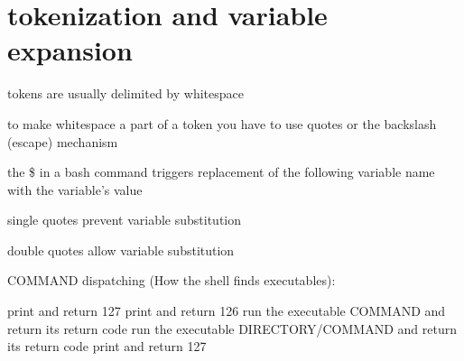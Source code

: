 \documentclass[landscape]{foils}
\begin{document}
\myNewSlide
\section*{ tokenization and variable expansion}
\begin{compactenum}
	\item tokens are usually delimited by whitespace
	\item to make whitespace a part of a token you have to use quotes or the backslash (escape) mechanism
	\item the \$ in a bash command triggers replacement of the following variable name with the variable's value
	\item single quotes prevent variable substitution
	\item double quotes allow variable substitution
\end{compactenum}


\myNewSlide

 COMMAND  dispatching (How the shell finds executables):
\begin{algorithmic}[1]
			\STATE print  and return 127
			\STATE print  and return 126
		\ELSE
			\STATE run the executable COMMAND and return its return code
		\ENDIF
	\ELSE
				\STATE run the executable DIRECTORY/COMMAND and return its return code
			\ENDIF
		\ENDFOR
		\STATE print  and return 127
	\ENDIF
\end{algorithmic}


\myNewSlide
\end{document}
